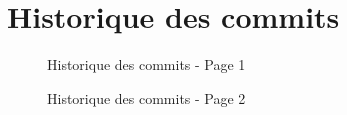 \documentclass [a4 paper,11pt]{report}
\begin{document}
\section{Historique des commits}

\begin{center}

  \begin{figure}[h!]
  \noindent{}
  \caption{Historique des commits - Page 1}
  \end{figure}

  \begin{figure}[h!]
  \noindent{}
  \caption{Historique des commits - Page 2}
  \end{figure}


\end{center}
\end{document}
